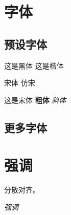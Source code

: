 \documentclass[UTF8]{ctexart}
\begin{document}
    \section{字体}
        \subsection{预设字体}
            {这是黑体}\newline
            {这是楷体}
            
            {\songti 宋体} \newline
            {\fangsong 仿宋} 
            
            {这是宋体}\newline
            \textbf{粗体} \quad \textit{斜体}       %

        \subsection{更多字体}
        
    \section{强调}
        \begin{CJKfilltwosides}{5cm}
            分散对齐。
        \end{CJKfilltwosides}\newline
        \emph{强调}
\end{document}

